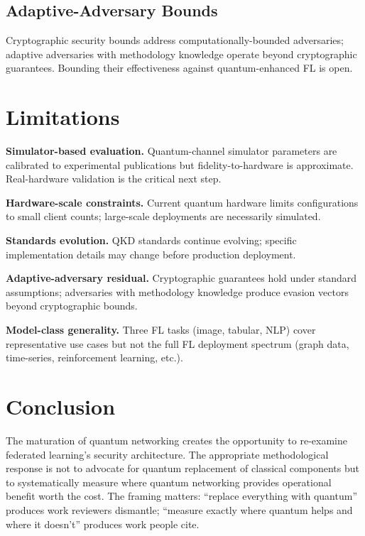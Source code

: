 \documentclass[sigconf,nonacm]{acmart}
\begin{document}
\subsection{Adaptive-Adversary Bounds}

Cryptographic security bounds address computationally-bounded
adversaries; adaptive adversaries with methodology knowledge
operate beyond cryptographic guarantees. Bounding their
effectiveness against quantum-enhanced FL is open.

\section{Limitations}

\textbf{Simulator-based evaluation.} Quantum-channel simulator
parameters are calibrated to experimental publications but
fidelity-to-hardware is approximate. Real-hardware validation is
the critical next step.

\textbf{Hardware-scale constraints.} Current quantum hardware
limits configurations to small client counts; large-scale
deployments are necessarily simulated.

\textbf{Standards evolution.} QKD standards continue evolving;
specific implementation details may change before production
deployment.

\textbf{Adaptive-adversary residual.} Cryptographic guarantees
hold under standard assumptions; adversaries with methodology
knowledge produce evasion vectors beyond cryptographic
bounds.

\textbf{Model-class generality.} Three FL tasks (image, tabular,
NLP) cover representative use cases but not the full FL
deployment spectrum (graph data, time-series, reinforcement
learning, etc.).

\section{Conclusion}

The maturation of quantum networking creates the opportunity to
re-examine federated learning's security architecture. The
appropriate methodological response is not to advocate for
quantum replacement of classical components but to systematically
measure where quantum networking provides operational benefit
worth the cost. The framing matters: ``replace everything with
quantum'' produces work reviewers dismantle; ``measure exactly
where quantum helps and where it doesn't'' produces work people
cite.
\end{document}
